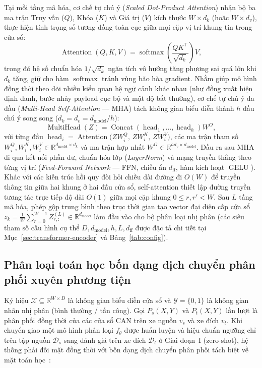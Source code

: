 \documentclass[12pt, a4paper, reqno, oneside]{book}
\begin{document}
Tại mỗi tầng mã hóa, cơ chế tự chú ý (\textit{Scaled Dot-Product Attention}) nhận bộ ba ma trận Truy vấn ($Q$), Khóa ($K$) và Giá trị ($V$) kích thước $W \times d_k$ (hoặc $W \times d_v$), thực hiện tính trọng số tương đồng toàn cục giữa mọi cặp vị trí khung tin trong cửa sổ:
\begin{equation}\label{eq:scaled-dot-attn}
\operatorname{Attention}(Q, K, V) = \operatorname{softmax}\!\left(\frac{QK^\top}{\sqrt{d_k}}\right)V,
\end{equation}
trong đó hệ số chuẩn hóa $1/\sqrt{d_k}$ ngăn tích vô hướng tăng phương sai quá lớn khi $d_k$ tăng, giữ cho hàm $\operatorname{softmax}$ tránh vùng bão hòa gradient. Nhằm giúp mô hình đồng thời theo dõi nhiều kiểu quan hệ ngữ cảnh khác nhau (như đồng xuất hiện định danh, bước nhảy payload cục bộ và mật độ bất thường), cơ chế tự chú ý đa đầu (\textit{Multi-Head Self-Attention} --- MHA) tách không gian biểu diễn thành $h$ đầu chú ý song song ($d_k = d_v = d_{\text{model}}/h$):
\begin{equation}\label{eq:mha}
\operatorname{MultiHead}(Z) = \operatorname{Concat}(\operatorname{head}_1, \ldots, \operatorname{head}_h) W^O,
\end{equation}
với từng đầu $\operatorname{head}_i = \operatorname{Attention}\!\big(Z W_i^Q,\, Z W_i^K,\, Z W_i^V\big)$, các ma trận tham số $W_i^Q, W_i^K, W_i^V \in \mathbb{R}^{d_{\text{model}} \times d_k}$ và ma trận hợp nhất $W^O \in \mathbb{R}^{h d_v \times d_{\text{model}}}$. Đầu ra sau MHA đi qua kết nối phần dư, chuẩn hóa lớp (\textit{LayerNorm}) và mạng truyền thẳng theo từng vị trí (\textit{Feed-Forward Network} --- FFN, chiều ẩn $d_{\text{ff}}$, hàm kích hoạt $\operatorname{GELU}$). Khác với các kiến trúc hồi quy đòi hỏi chiều dài đường đi $O(W)$ để truyền thông tin giữa hai khung ở hai đầu cửa sổ, self-attention thiết lập đường truyền tương tác trực tiếp độ dài $O(1)$ giữa mọi cặp khung $0 \le r, r' < W$. Sau $L$ tầng mã hóa, phép gộp trung bình theo trục thời gian tạo vector đại diện cấp cửa sổ $z_k = \frac{1}{W}\sum_{r=0}^{W-1} Z^{(L)}_{r,:} \in \mathbb{R}^{d_{\text{model}}}$ làm đầu vào cho bộ phân loại nhị phân (các siêu tham số cấu hình cụ thể $D, d_{\text{model}}, h, L, d_{\text{ff}}$ được đặc tả chi tiết tại Mục~\ref{sec:transformer-encoder} và Bảng~\ref{tab:config}).

\subsection{Phân loại toán học bốn dạng dịch chuyển phân phối xuyên phương tiện}\label{subsec:domain-shifts}
Ký hiệu $\mathcal{X} \subseteq \mathbb{R}^{W \times D}$ là không gian biểu diễn cửa sổ và $\mathcal{Y} = \{0, 1\}$ là không gian nhãn nhị phân (bình thường / tấn công). Gọi $P_s(X, Y)$ và $P_t(X, Y)$ lần lượt là phân phối đồng thời của các cửa sổ CAN trên xe nguồn $v_s$ và xe đích $v_t$. Khi chuyển giao một mô hình phân loại $f_\theta$ được huấn luyện và hiệu chuẩn ngưỡng chỉ trên tập nguồn $\mathcal{D}_s$ sang đánh giá trên xe đích $\mathcal{D}_t$ ở Giai đoạn~I (zero-shot), hệ thống phải đối mặt đồng thời với bốn dạng dịch chuyển phân phối tách biệt về mặt toán học~\cite{shimodaira2000covariate,quinonerocandela2009dataset,morenotorres2012shift,zhao2019invariant}:
\end{document}
